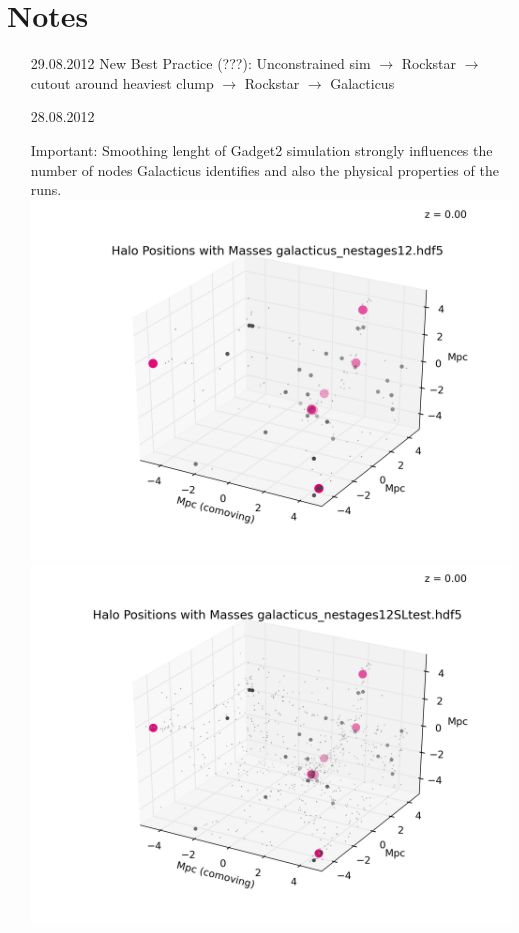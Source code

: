 
\chapter{Notes}
\begin{itemize}


\item[29.08.2012]
New Best Practice (???): Unconstrained sim $\rightarrow$ Rockstar $\rightarrow$ cutout around heaviest 
clump $\rightarrow$ Rockstar $\rightarrow$ Galacticus

\item[28.08.2012]

Important: Smoothing lenght of Gadget2 simulation strongly influences 
the number of nodes Galacticus identifies and also the physical properties 
of the runs. \\
\includegraphics[scale=0.75]{analysis/galacticus/positionPlotsMasses/Halo_Positions_with_Masses_galacticus_nestages12_5Mpc_0003.png} \\
\includegraphics[scale=0.75]{analysis/galacticus/positionPlotsMasses/Halo_Positions_with_Masses_galacticus_nestages12SLtest_5Mpc_0003.png} \\

\end{itemize}
